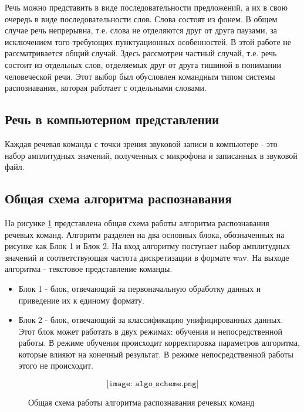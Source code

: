 Речь можно представить в виде последовательности предложений, а их в свою очередь в виде последовательности слов. Слова состоят из фонем. В общем случае речь непрерывна, т.е. слова не отделяются друг от друга паузами, за исключением того требующих пунктуационных особенностей. В этой работе не рассматривается общий случай. Здесь рассмотрен частный случай, т.е. речь состоит из отдельных слов, отделяемых друг от друга тишиной в понимании человеческой речи. Этот выбор был обусловлен командным типом системы распознавания, которая работает с отдельными словами.

\subsection{Речь в компьютерном представлении}
Каждая речевая команда с точки зрения звуковой записи в компьютере - это набор амплитудных значений, полученных с микрофона и записанных в звуковой файл.

\subsection{Общая схема алгоритма распознавания}
На рисунке \ref{fig:algo_scheme} представлена общая схема работы алгоритма распознавания речевых команд. Алгоритм разделен на два основных блока, обозначенных на рисунке как Блок 1 и Блок 2. На вход алгоритму поступает набор амплитудных значений и соответствующая частота дискретизации в формате wav. На выходе алгоритма - текстовое представление команды.

\begin{itemize}[leftmargin=2cm]
\item Блок 1 - блок, отвечающий за первоначальную обработку данных и приведение их к единому формату. 
\item Блок 2 - блок, отвечающий за классификацию унифицированных данных. Этот блок может работать в двух режимах: обучения и непосредственной работы. В режиме обучения происходит корректировка параметров алгоритма, которые влияют на конечный результат. В режиме непосредственной работы этого не происходит.
\end{itemize}

\begin{figure}[H]
  \[\texttt{[image: algo\_scheme.png]}\]
  \caption{Общая схема работы алгоритма распознавания речевых команд}
  \label{fig:algo_scheme}
\end{figure}